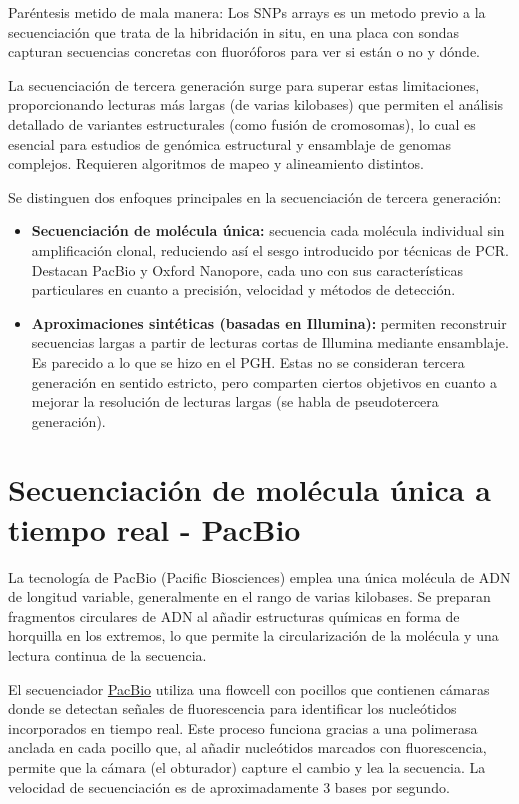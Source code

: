     Paréntesis metido de mala manera: Los SNPs arrays es un metodo previo a la secuenciación que trata de la hibridación in situ, en una placa con sondas capturan secuencias concretas con fluoróforos para ver si están o no y dónde.

La secuenciación de tercera generación surge para superar estas limitaciones, proporcionando lecturas más largas (de varias kilobases) que permiten el análisis detallado de variantes estructurales (como fusión de cromosomas), lo cual es esencial para estudios de genómica estructural y ensamblaje de genomas complejos. Requieren algoritmos de mapeo y alineamiento distintos.

Se distinguen dos enfoques principales en la secuenciación de tercera generación:
\begin{itemize}
\item \textbf{Secuenciación de molécula única:} secuencia cada molécula individual sin amplificación clonal, reduciendo así el sesgo introducido por técnicas de PCR. Destacan PacBio y Oxford Nanopore, cada uno con sus características particulares en cuanto a precisión, velocidad y métodos de detección.
\item \textbf{Aproximaciones sintéticas (basadas en Illumina):} permiten reconstruir secuencias largas a partir de lecturas cortas de Illumina mediante ensamblaje.  Es parecido a lo que se hizo en el PGH. Estas no se consideran tercera generación en sentido estricto, pero comparten ciertos objetivos en cuanto a mejorar la resolución de lecturas largas (se habla de pseudotercera generación).
\end{itemize}

\section{Secuenciación de molécula única a tiempo real - PacBio}
La tecnología de PacBio (Pacific Biosciences) emplea una única molécula de ADN de longitud variable, generalmente en el rango de varias kilobases. Se preparan fragmentos circulares de ADN al añadir estructuras químicas en forma de horquilla en los extremos, lo que permite la circularización de la molécula y una lectura continua de la secuencia.

El secuenciador \href{https://www.youtube.com/watch?v=_lD8JyAbwEo}{PacBio} utiliza una flowcell con pocillos que contienen cámaras donde se detectan señales de fluorescencia para identificar los nucleótidos incorporados en tiempo real. Este proceso funciona gracias a una polimerasa anclada en cada pocillo que, al añadir nucleótidos marcados con fluorescencia, permite que la cámara (el obturador) capture el cambio y lea la secuencia. La velocidad de secuenciación es de aproximadamente 3 bases por segundo.


